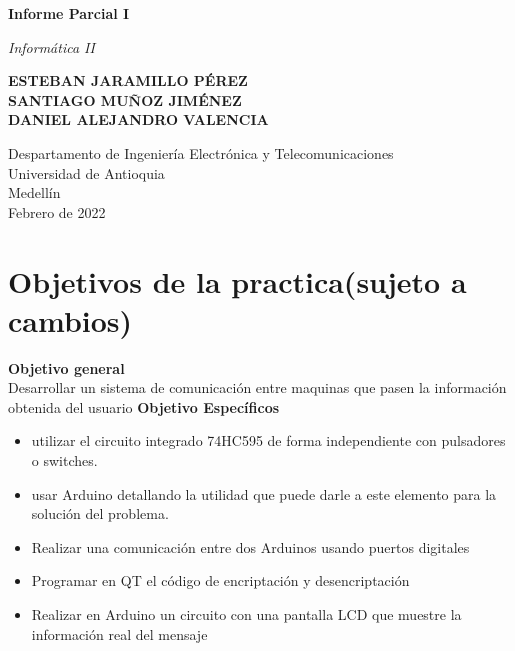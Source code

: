 \documentclass{article}
\begin{document}
\begin{titlepage}
    \begin{center}
        \vspace*{1cm}
        
        \Huge
        \textbf{Informe Parcial I}
            
        \vspace{0.5cm}
        \LARGE
       \textit{ Informática II}
            
        \vspace{1.5cm}
            
        \textbf{ESTEBAN JARAMILLO PÉREZ\\
        SANTIAGO MUÑOZ JIMÉNEZ\\
        DANIEL ALEJANDRO VALENCIA}
            
        \vfill
            
        \vspace{0.8cm}
            
        \Large
        Despartamento de Ingeniería Electrónica y Telecomunicaciones\\
        Universidad de Antioquia\\
        Medellín\\
        Febrero de 2022
            
    \end{center}
\end{titlepage}

\tableofcontents
\newpage
\newpage
\section{Objetivos de la practica(sujeto a cambios)}
\label{objetivos}
\textbf{Objetivo general}\\
Desarrollar un sistema de comunicación entre maquinas que pasen la información obtenida del usuario
\newline
\newline
\textbf{Objetivo Específicos}

\justifying
\begin{itemize}

    \item utilizar el circuito integrado 74HC595 de forma independiente con pulsadores o switches.
    
    \item usar Arduino detallando la utilidad que puede darle a este elemento para la solución del problema.
    
    \item  Realizar una comunicación entre dos Arduinos usando puertos digitales

    \item Programar en QT el código de encriptación y desencriptación
    
    \item Realizar en Arduino un circuito con una pantalla LCD que muestre la información real del mensaje
    
   
    
\end{itemize}
\end{document}
